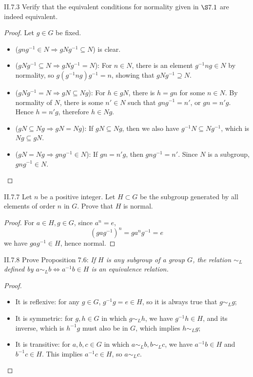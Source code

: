 \begin{problem}{II.7.3}
Verify that the equivalent conditions for normality given in $\S 7.1$ are indeed equivalent.
\end{problem}
\begin{proof}
Let $g \in G$ be fixed.
\begin{itemize}
    \setlength\itemsep{0pt}
    \item ($gng^{-1} \in N \Rightarrow gNg^{-1} \subseteq N$) is clear.
    \item ($gNg^{-1} \subseteq N \Rightarrow gNg^{-1} = N$): For $n \in N$, there is an element $g^{-1}ng \in N$ by normality, so $g(g^{-1}ng)g^{-1} = n$, showing that $gNg^{-1} \supseteq N$.
    \item ($gNg^{-1} = N \Rightarrow gN \subseteq Ng$): For $h \in gN$, there is $h = gn$ for some $n \in N$. By normality of $N$, there is some $n' \in N$ such that $gng^{-1} = n'$, or $gn = n'g$. Hence $h = n'g$, therefore $h \in Ng$.
    \item ($gN \subseteq Ng \Rightarrow gN = Ng$): If $gN \subseteq Ng$, then we also have $g^{-1}N \subseteq Ng^{-1}$, which is $Ng \subseteq gN$.
    \item ($gN = Ng \Rightarrow gng^{-1} \in N$): If $gn = n'g$, then $gng^{-1} = n'$. Since $N$ is a subgroup, $gng^{-1} \in N$. 
\end{itemize}
\end{proof}

\begin{problem}{II.7.7}
Let $n$ be a positive integer. Let $H \subset G$ be the subgroup generated by all elements of order $n$ in $G$. Prove that $H$ is normal.
\end{problem}
\begin{proof}
For $a \in H, g \in G$, since $a^n = e$,
\[
(gag^{-1})^n = ga^ng^{-1} = e
\]
we have $gag^{-1} \in H$, hence normal.
\end{proof}

\begin{problem}{II.7.8}
Prove Proposition 7.6: \textit{If $H$ is any subgroup of a group $G$, the relation $\sim_L$ defined by $a \sim_L b \Leftrightarrow a^{-1}b \in H$ is an equivalence relation.}
\end{problem}
\begin{proof}\
\begin{itemize}
    \item It is reflexive: for any $g \in G$, $g^{-1}g = e \in H$, so it is always true that $g \sim_L g$;
    \item It is symmetric: for $g,h \in G$ in which $g \sim_L h$, we have $g^{-1}h \in H$, and its inverse, which is $h^{-1}g$ must also be in $G$, which implies $h \sim_L g$;
    \item It is transitive: for $a,b,c \in G$ in which $a \sim_L b, b \sim_L c$, we have $a^{-1}b \in H$ and $b^{-1}c \in H$. This implies $a^{-1}c \in H$, so $a \sim_L c$.
\end{itemize}
\end{proof}

